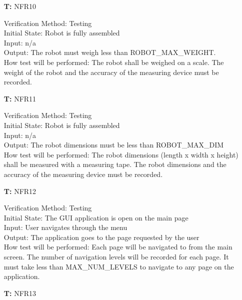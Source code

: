 \documentclass[12pt, titlepage]{article}
\newcounter{tnum} %
\begin{document}
\begin{itemize}
				
\item[\textbf{T\refstepcounter{tnum}\thetnum:}]{NFR10\\}

Verification Method: Testing	\\				
Initial State: Robot is fully assembled	\\			
Input: n/a\\
Output: The robot must weigh less than ROBOT\_MAX\_WEIGHT.\\
How test will be performed: The robot shall be weighed on a scale. The weight of the robot and the accuracy of the measuring device must be recorded.\\

\item[\textbf{T\refstepcounter{tnum}\thetnum:}]{NFR11\\}

Verification Method: Testing\\					
Initial State: Robot is fully assembled	\\			
Input: n/a\\
Output: The robot dimensions must be less than ROBOT\_MAX\_DIM \\
How test will be performed: The robot dimensions (length x width x height) shall be measured with a measuring tape. The robot dimensions and the accuracy of the measuring device must be recorded.\\

\item[\textbf{T\refstepcounter{tnum}\thetnum:}]{NFR12\\}

Verification Method: Testing\\					
Initial State: The GUI application is open on the main page\\			
Input: User navigates through the menu\\
Output: The application goes to the page requested by the user\\
How test will be performed: Each page will be navigated to from the main screen. The number of navigation levels will be recorded for each page. It must take less than MAX\_NUM\_LEVELS to navigate to any page on the application.\\

\item[\textbf{T\refstepcounter{tnum}\thetnum:}]{NFR13\\}


\end{itemize}
\end{document}
